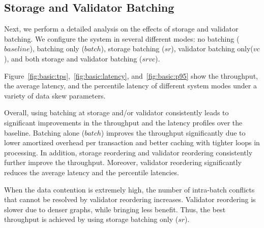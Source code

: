 \subsection{Storage and Validator Batching}
\label{subsec:experiment:batching}

Next, we perform a detailed analysis on the effects of storage and validator batching. We configure the system in several different modes: no batching ($baseline$), batching only ($batch$), storage batching ($sr$), validator batching only($vc$), and both storage and validator batching ($srvc$).




Figure~\ref{fig:basic:tps},~\ref{fig:basic:latency}, and~\ref{fig:basic:p95} show the throughput, the average latency, and the percentile latency of different system modes under a variety of data skew parameters. 

Overall, using batching at storage and/or validator consistently leads to significant improvements in the throughput and the latency profiles over the baseline. Batching alone ($batch$) improves the throughput significantly due to lower amortized overhead per transaction and better caching with tighter loops in processing. In addition, storage reordering and validator reordering consistently further improve the throughput. Moreover, validator reordering significantly reduces the average latency and the percentile latencies.


When the data contention is extremely high, the number of intra-batch conflicts
that cannot be resolved by validator reordering increases. Validator reordering
is slower due to denser graphs, while bringing less benefit. Thus, the best throughput is achieved by using storage batching only ($sr$). 


